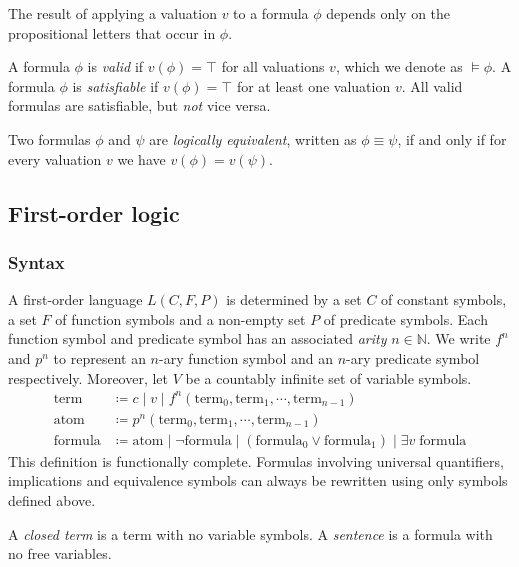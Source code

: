 The result of applying a valuation \(v\) to a formula \(\phi\) depends only on the propositional letters that occur in \(\phi\). 

A formula \(\phi\) is \emph{valid} if \(v(\phi) = \top\) for all valuations \(v\), which we denote as \(\models \phi\). A formula \(\phi\) is \emph{satisfiable} if \(v(\phi) = \top\) for at least one valuation \(v\). All valid formulas are satisfiable, but \emph{not} vice versa.

Two formulas \(\phi\) and \(\psi\) are \emph{logically equivalent}, written as \(\phi \equiv \psi\), if and only if for every valuation \(v\) we have \(v(\phi) = v(\psi)\).



\subsection{First-order logic}

\subsubsection{Syntax}

A first-order language \(L(C, F, P)\) is determined by a set \(C\) of constant symbols, a set \(F\) of function symbols and a non-empty set \(P\) of predicate symbols. Each function symbol and predicate symbol has an associated \emph{arity} \(n \in \mathbb{N}\). We write \(f^n\) and \(p^n\) to represent an \(n\)-ary function symbol and an \(n\)-ary predicate symbol respectively. Moreover, let \(V\) be a countably infinite set of variable symbols.
%
\begin{align*}
    \text{term} &\coloneq c \;\vert\; v \;\vert\; f^n (\text{term}_0, \text{term}_1, \cdots, \text{term}_{n-1}) \tag{where \(c \in C\), \(v \in V\) and \(f^n \in F\)}\\
    \text{atom} &\coloneq p^n (\text{term}_0, \text{term}_1, \cdots, \text{term}_{n-1}) \tag{where \(p^n \in P\)}\\
    \text{formula} &\coloneq \text{atom} \;\vert\; \neg \text{formula} \;\vert\; (\text{formula}_0 \lor \text{formula}_1) \;\vert\; \exists v\; \text{formula}  \tag{where \(v \in V\)}
\end{align*}
%
This definition is functionally complete. Formulas involving universal quantifiers, implications and equivalence symbols can always be rewritten using only symbols defined above.

A \emph{closed term} is a term with no variable symbols. A \emph{sentence} is a formula with no free variables.



